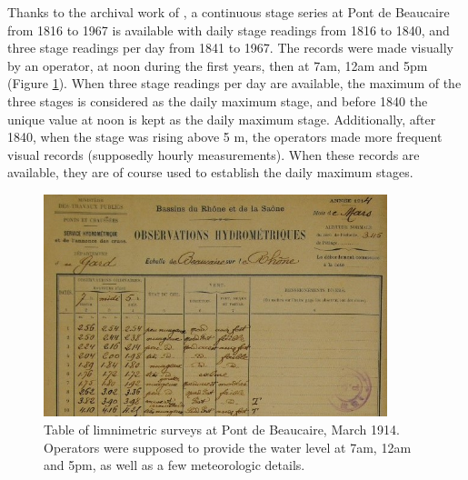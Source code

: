 \documentclass[11pt]{article}
\begin{document}
    Thanks to the archival work of \citet{pichard_hydro-climatology_2017}, a continuous stage series at Pont de Beaucaire from 1816 to 1967 is available with daily stage readings from 1816 to 1840, and three stage readings per day from 1841 to 1967. The records were made visually by an operator, at noon during the first years, then at 7am, 12am and 5pm (Figure \ref{fig:TabObsPt}). When three stage readings per day are available, the maximum of the three stages is considered as the daily maximum stage, and before 1840 the unique value at noon is kept as the daily maximum stage. Additionally, after 1840, when the stage was rising above 5 m, the operators made more frequent visual records (supposedly hourly measurements). When these records are available, they are of course used to establish the daily maximum stages.
    
        \begin{figure}[h!]
            \centering
            \includegraphics[width = 10cm]{Figs/4-TabObsBcrSmall.jpg}
            \caption{Table of limnimetric surveys at Pont de Beaucaire, March 1914. Operators were supposed to provide the water level at 7am, 12am and 5pm, as well as a few meteorologic details. \citep{pontschaussees_observations_1914}}
            \label{fig:TabObsPt}
        \end{figure}
        
\end{document}
